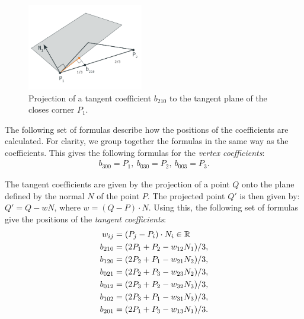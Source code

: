 \begin{figure}
	\centering
	\includegraphics[width=0.45\textwidth]{./content/img/method/geometry_tangent_projection.png}
	\caption{Projection of a tangent coefficient $b_{210}$ to the tangent plane of the closes corner $P_1$.}
	\label{fig:method:geometry_tangent_projection.png}
\end{figure}


The following set of formulas describe how the positions of the coefficients are calculated. For clarity, we group together the formulas in the same way as the coefficients. This gives the following formulas for the \textit{vertex coefficients}:
\begin{align}\label{eq:method:vertex_coefficients}
	b_{300} = P_1,\ b_{030} = P_2,\ b_{003} = P_3.
\end{align}

The tangent coefficients are given by the projection of a point $Q$ onto the plane defined by the normal $N$ of the point $P$. The projected point $Q'$ is then given by: $Q' = Q - wN$, where $w = (Q - P) \cdot N$. Using this, the following set of formulas give the positions of the \textit{tangent coefficients}:
\begin{align}\label{eq:method:tangent_coefficients}
	w_{ij} = {}& (P_j - P_i) \cdot N_i \in \mathbb{R} \nonumber\\
	b_{210} = {}& (2 P_1 + P_2 - w_{12}N_1) / 3,\nonumber\\
	b_{120} = {}& (2 P_2 + P_1 - w_{21}N_2) / 3,\nonumber\\
	b_{021} = {}& (2 P_2 + P_3 - w_{23}N_2) / 3, \\
	b_{012} = {}& (2 P_3 + P_2 - w_{32}N_3) / 3,\nonumber\\
	b_{102} = {}& (2 P_3 + P_1 - w_{31}N_3) / 3,\nonumber\\
	b_{201} = {}& (2 P_1 + P_3 - w_{13}N_1) / 3. \nonumber
\end{align}

